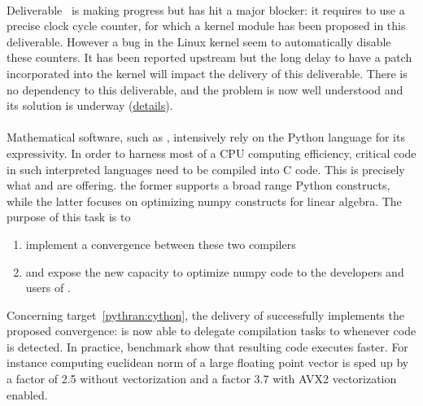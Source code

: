 \documentclass{deliverablereport}
\begin{document}
  \paragraph{}


  \paragraph{}
  Deliverable~ is making progress but has hit a
  major blocker: it requires to use a precise clock cycle counter, for which a kernel
  module has been proposed in this deliverable. However a bug in the Linux kernel seem to
  automatically disable these counters. It has been reported upstream but the long delay
  to have a patch incorporated into the kernel will impact the delivery of this
  deliverable. There is no dependency to this deliverable, and the problem is now well
  understood and its solution is underway
  (\href{https://github.com/OpenDreamKit/OpenDreamKit/issues/118}{details}).

  \paragraph{}

  \paragraph{}

Mathematical software, such as \Sage, intensively rely on the Python
language for its expressivity. In order to harness most of a CPU computing
efficiency, critical code in such interpreted languages need to be compiled into
C code. This is precisely what \Cython and \Pythran are offering. the former
supports a broad range Python constructs, while the latter focuses on optimizing
numpy constructs for linear algebra.
The purpose of this task is to
\begin{enumerate}
\item\label{pythran:cython} implement a convergence between these two compilers
\item\label{pythran:sage} and expose the new capacity to optimize numpy code to the developers and
  users of \Sage.  
\end{enumerate}

Concerning target~\ref{pythran:cython}, the delivery of  successfully implements the
proposed convergence: \Cython is now able to delegate compilation tasks to
\Pythran whenever \Numpy code is detected. In practice, benchmark show that
resulting code executes faster. For instance computing euclidean norm of a large
floating point vector is sped up by a factor of 2.5 without vectorization and
a factor 3.7 with AVX2 vectorization enabled.
\end{document}
